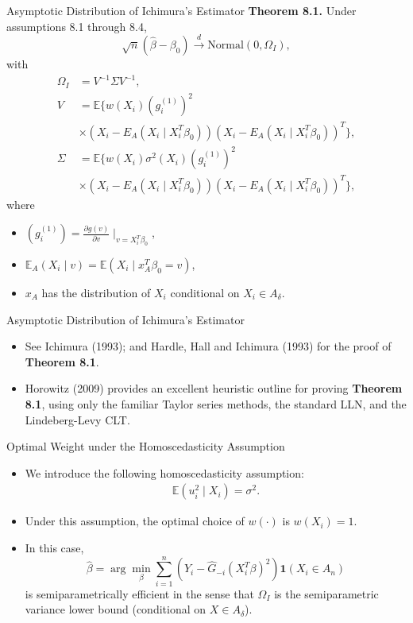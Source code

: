 \documentclass[xcolor=svgnames,dvipdfmx,cjk]{beamer}
\theoremstyle{example}
\def\E{\mathbb{E}}
\def\darrow{\xrightarrow{d}}
\begin{document}
  \begin{frame}{Asymptotic Distribution of Ichimura's Estimator}
  \textbf{Theorem 8.1.} Under assumptions 8.1 through 8.4,
      \[ \sqrt{n}(\hat{\beta} - \beta_0)
        \darrow \text{Normal} (0, \Omega_I),
      \]
  with
    \begin{align*}
      \Omega_I &= V^{-1} \Sigma V^{-1}, \\
      V &= \E\{
        w(X_i) (g_i^{(1)})^2 \\
        & \times (X_i - E_A(X_i\mid X_i^T \beta_0)) (X_i - E_A(X_i\mid X_i^T \beta_0))^T 
      \}, \\
      \Sigma &= \E \{
        w(X_i) \sigma^2(X_i) (g_i^{(1)})^2 \\
        & \times (X_i - E_A(X_i\mid X_i^T \beta_0)) (X_i - E_A(X_i\mid X_i^T \beta_0))^T 
      \},
    \end{align*}
    where
    \begin{itemize}
      \item $(g_i^{(1)}) = \frac{\partial g(v)}{\partial v}\mid_{v= X_i^T \beta_0}$,
      \item $\E_A (X_i\mid v) = \E(X_i \mid x_A^T\beta_0 = v)$,
      \item $x_A$ has the distribution of $X_i$ conditional on $X_i \in A_\delta$.
    \end{itemize}
  \end{frame}
  
  \begin{frame}{Asymptotic Distribution of Ichimura's Estimator}
  \begin{itemize}
    \item See Ichimura (1993); and Hardle, Hall and Ichimura (1993) for the proof of \textbf{Theorem 8.1}.
    \item Horowitz (2009) provides an excellent heuristic outline for proving \textbf{Theorem 8.1}, 
          using only the familiar Taylor series methods, the standard LLN, and the Lindeberg-Levy CLT.
  \end{itemize}
  \end{frame}
  
  
  \begin{frame}{Optimal Weight under the Homoscedasticity Assumption}
  \begin{itemize}
    \item We introduce the following homoscedasticity assumption:
          \begin{align*}
            \E(u_i^2 \mid X_i) = \sigma^2.
          \end{align*}
    \item Under this assumption, the optimal choice of $w(\cdot)$ is $w(X_i)=1$.
    \item In this case, 
          \[ \hat{\beta} = \arg\min_{\beta} \sum_{i=1}^{n} (Y_i - \hat{G}_{-i}(X_i^{T}\beta)^2)\mathbf{1}(X_i \in A_n) \]
          is \alert{semiparametrically efficient} in the sense that 
          $\Omega_I$ is \alert{the semiparametric variance lower bound} (conditional on $X \in A_\delta$).
  \end{itemize}
  \end{frame}
  
\end{document}
